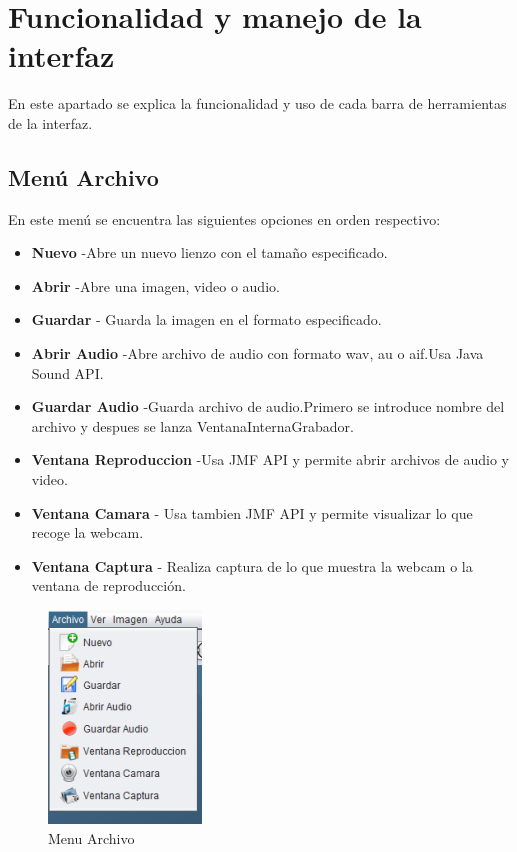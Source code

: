 \section{Funcionalidad y manejo de la interfaz }
En este apartado se explica la funcionalidad y uso de cada barra de herramientas de la interfaz.
\subsection{Menú Archivo}
En este menú se encuentra las siguientes opciones en orden respectivo:
\begin{itemize}
\item \textbf{Nuevo} -Abre un nuevo lienzo con el tamaño especificado.
\item \textbf{Abrir} -Abre una imagen, video o audio.
\item \textbf{Guardar} - Guarda la imagen en el formato especificado\cite{guardar}.
\item \textbf{Abrir Audio} -Abre archivo de audio con formato wav, au o aif.Usa Java Sound API.
\item \textbf{Guardar Audio} -Guarda archivo de audio.Primero se introduce nombre del archivo y despues se lanza VentanaInternaGrabador. 
\item \textbf{Ventana Reproduccion} -Usa JMF API y permite abrir archivos de audio y video.
\item \textbf{Ventana Camara} - Usa tambien JMF API y permite visualizar lo que recoge la webcam.
\item \textbf{Ventana Captura} - Realiza captura de lo que muestra la webcam o la ventana de reproducción. 
\end{itemize}


\begin{figure}[H]
  \centering
    \includegraphics[scale=0.70]{images/menuarchivofinal}
  \caption{Menu Archivo}
  \label{Menu Archivo}
\end{figure}

